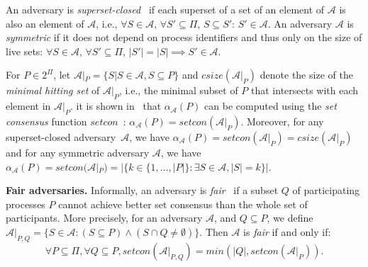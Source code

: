 \documentclass[a4paper]{article}
\newtheorem{theorem}{Theorem}
\newtheorem{definition}{Definition}
\newcommand{\myparagraph}[1]{\vspace{6pt}\noindent \textbf{#1}}
\def\A{\ensuremath{\mathcal{A}}}
\def\fair{\textit{fair}}
\def\Fair{\textit{Fair}}
\def\HSS{\mathit{csize}}
\newcommand{\setcon}{\mathit{setcon}}
\begin{document}
%

An adversary is \emph{superset-closed}~\cite{Kuz12} if each superset of a set of an
element of $\A$ is also an element of $\A$, i.e.,
$\forall S\in \A$, $\forall S'\subseteq \Pi$, $S\subseteq S'$: $S'\in\A$. 
%
%
%
%
An adversary $\A$ is \emph{symmetric} if it does not depend on process
identifiers and thus only on the size of live sets: 
$\forall S \in \A$, $\forall S' \subseteq \Pi$, $|S'|=|S|\implies S'\in\A$.

%
For  $P\in 2^{\Pi}$, let $\A|_P=\{S|S\in\A,S\subseteq P\}$
and $\HSS(\A|_P)$ denote the size of the \emph{minimal hitting set} of $\A|_P$, i.e., the minimal subset of $P$ that
intersects with each element in $\A|_P$.  
it is shown in~\cite{KR17} that $\alpha_{\A}(P)$ can be computed using the
\emph{set consensus} function $\setcon$~\cite{GK10}:  $\alpha_{\A}(P)=\setcon(\A|_P)$.
Moreover, for any superset-closed adversary~$\A$, we have
$\alpha_{\A}(P) = \setcon(\A|_P) = \HSS(\A|_P)$ and for any symmetric adversary $\A$, we have
$\alpha_{\A}(P)= \setcon(\A|_P) = |\{k\in\{1,\ldots,|P|\}: \exists S \in \A, |S|=k\}|$.

\myparagraph{Fair adversaries.}
%
Informally, an adversary is \emph{{\fair}}~\cite{KR17} if a subset $Q$ of
participating processes $P$ cannot achieve better set consensus than the
whole set of participants. %
More precisely, for an adversary $\A$, and $Q\subseteq P$, we define 
$\A|_{P,Q} = \{S\in\A:(S\subseteq P)\wedge(S\cap Q\neq\emptyset)\}$.
Then $\A$ is {\fair} if and only if:
\[\forall P \subseteq \Pi, \forall Q\subseteq P, \setcon(\A|_{P,Q})= min(|Q|,\setcon(\A|_P)){}.\]
\end{document}
